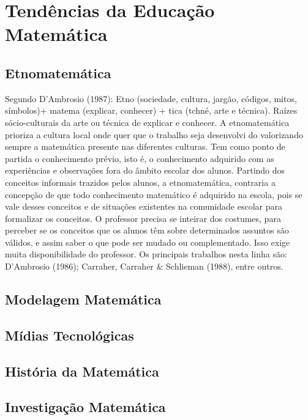 \chapter{Tendências da Educação Matemática}

\section{Etnomatemática}
Segundo D'Ambrosio (1987): Etno (sociedade, cultura, jargão, códigos, mitos, símbolos)\linebreak + matema (explicar, conhecer) + tica (tchné, arte e técnica). Raízes sócio-culturais da arte ou técnica de explicar e conhecer. A etnomatemática prioriza a cultura local onde quer que o trabalho seja desenvolvi do valorizando sempre a matemática presente nas diferentes culturas. Tem como ponto de partida o conhecimento prévio, isto é, o conhecimento adquirido com as experiências e observações fora do âmbito escolar dos alunos. Partindo dos conceitos informais trazidos pelos alunos, a etnomatemática, contraria a concepção de que todo conhecimento matemático é adquirido na escola, pois se vale desses conceitos e de situações existentes na comunidade escolar para formalizar os conceitos. O professor precisa se inteirar dos costumes, para perceber se os conceitos que os alunos têm sobre determinados assuntos são válidos, e assim saber o que pode ser mudado ou complementado. Isso exige muita disponibilidade do professor. Os principais trabalhos nesta linha são: D'Ambrosio (1986); Carraher, Carraher \& Schlieman (1988), entre outros. 
\section{Modelagem Matemática}
\section{Mídias Tecnológicas}
\section{História da Matemática}
\section{Investigação Matemática}
